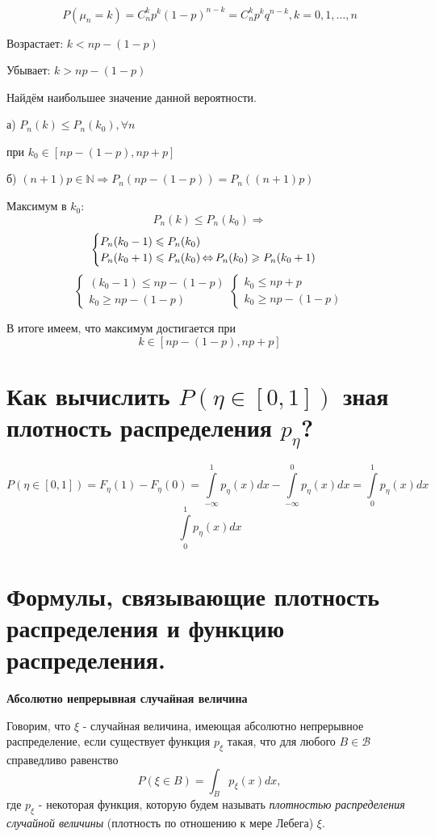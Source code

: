 \[ P(\mu_n = k) = C_n^kp^k(1-p)^{n-k} = C_n^k p^k q^{n-k}, k = 0,1, \dots, n \]

Возрастает: $k < np - (1-p)$

Убывает: $k > np - (1-p)$

Найдём наибольшее значение данной вероятности.

а) $ P_n(k) \le P_n(k_0), \forall n $

при $k_0 \in [np - (1-p), np+p]$

б) $ (n+1)p \in \mathbb{N} \Rightarrow P_n(np-(1-p)) = P_n((n+1)p) $

Максимум в $k_0$:
\[ P_n(k) \le P_n(k_0) \Rightarrow \]
\[
\begin{cases}
	P_n(k_0 - 1) \leqslant P_n(k_0) \\
	P_n(k_0 + 1) \leqslant P_n(k_0) \operatorname{\Leftrightarrow} P_n(k_0) \geqslant P_n(k_0+1)
\end{cases} 
\]
\[
\begin{cases}
	(k_0 - 1) \le np - (1-p) \\
	k_0 \ge np - (1-p)
\end{cases}
\begin{cases}
	k_0 \le np + p \\
	k_0 \ge np - (1-p)
\end{cases}
\]

В итоге имеем, что максимум достигается при 
\[k \in [np-(1-p), np+p]\]

\section{Как вычислить $P(\eta \in [0,1 ])$ зная плотность распределения $p_{\eta}$?}

\[P(\eta \in [0,1]) = F_\eta(1) - F_\eta(0) = \int\limits_{-\infty}^{1} p_\eta(x) dx - \int\limits_{-\infty}^{0} p_\eta(x) dx = \int\limits_{0}^{1} p_\eta(x) dx\]
\[ \int\limits_{0}^{1} p_{\eta} (x) dx \]

\section{Формулы, связывающие плотность распределения и функцию распределения.}

\noindent \textbf{Абсолютно непрерывная случайная величина}

Говорим, что $\xi$ - случайная величина, имеющая абсолютно непрерывное распределение, если существует функция $p_{\xi}$ такая, что для любого $B \in \mathcal{B}$ справедливо равенство
\[ P(\xi \in B) = \int_B p_{\xi} (x) dx, \]
где $p_{\xi}$ - некоторая функция, которую будем называть \textit{плотностью распределения случайной величины} (плотность по отношению к мере Лебега) $\xi$.

